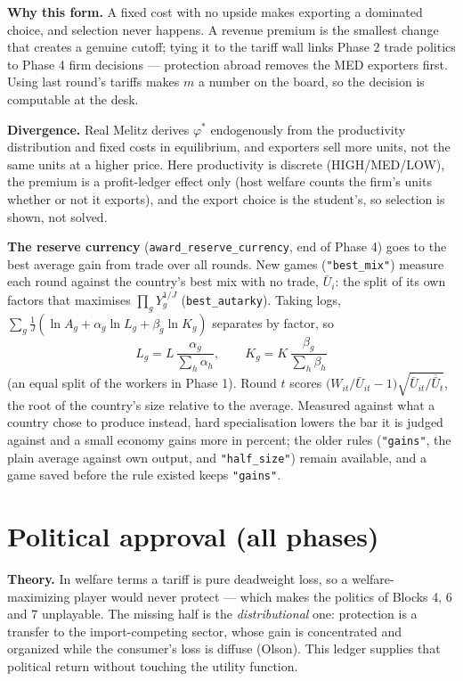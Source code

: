 \documentclass[11pt]{article}
\newcommand{\code}[1]{\texttt{#1}}
\begin{document}
\textbf{Why this form.} A fixed cost with no upside makes exporting a dominated
choice, and selection never happens. A revenue premium is the smallest change
that creates a genuine cutoff; tying it to the tariff wall links Phase 2 trade
politics to Phase 4 firm decisions --- protection abroad removes the MED
exporters first. Using last round's tariffs makes $m$ a number on the board, so
the decision is computable at the desk.

\textbf{Divergence.} Real Melitz derives $\varphi^\ast$ endogenously from the
productivity distribution and fixed costs in equilibrium, and exporters sell
more units, not the same units at a higher price. Here productivity is discrete
(HIGH/MED/LOW), the premium is a profit-ledger effect only (host welfare counts
the firm's units whether or not it exports), and the export choice is the
student's, so selection is shown, not solved.

\textbf{The reserve currency} (\code{award\_reserve\_currency}, end of Phase 4)
goes to the best average gain from trade over all rounds. New games
(\code{"best\_mix"}) measure each round against the country's best mix with no
trade, $\bar U_i$: the split of its own factors that maximises $\prod_g Y_g^{1/J}$
(\code{best\_autarky}). Taking logs, $\sum_g \frac1J(\ln A_g + \alpha_g \ln L_g +
\beta_g \ln K_g)$ separates by factor, so
\[
L_g = L\,\frac{\alpha_g}{\sum_h \alpha_h}, \qquad
K_g = K\,\frac{\beta_g}{\sum_h \beta_h}
\]
(an equal split of the workers in Phase 1). Round $t$ scores
$\bigl(W_{it}/\bar U_{it} - 1\bigr)\sqrt{\bar U_{it}/\overline{\bar U}_t}$, the
root of the country's size relative to the average. Measured against what a
country chose to produce instead, hard specialisation lowers the bar it is
judged against and a small economy gains more in percent; the older rules
(\code{"gains"}, the plain average against own output, and \code{"half\_size"}) remain
available, and a game saved before the rule existed keeps \code{"gains"}.

\section{Political approval (all phases)}
\textbf{Theory.} In welfare terms a tariff is pure deadweight loss, so a
welfare-maximizing player would never protect --- which makes the politics of
Blocks 4, 6 and 7 unplayable. The missing half is the \emph{distributional}
one: protection is a transfer to the import-competing sector, whose gain is
concentrated and organized while the consumer's loss is diffuse (Olson). This
ledger supplies that political return without touching the utility function.
\end{document}
